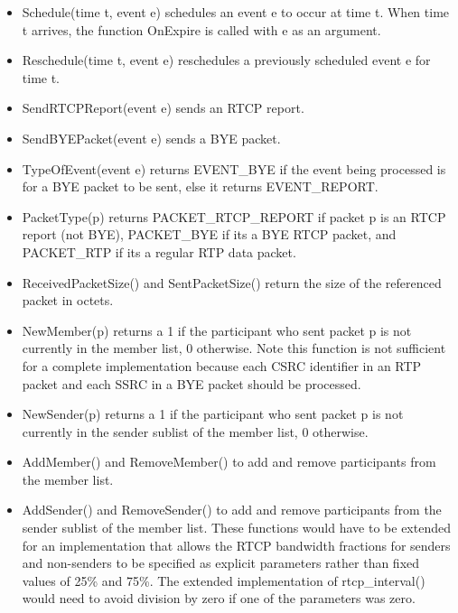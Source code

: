\documentclass{article}
\begin{document}
\begin{itemize}
\item Schedule(time t, event e) schedules an event e to occur at time t. When time t arrives, the function OnExpire is called with e as an argument.
\item Reschedule(time t, event e) reschedules a previously scheduled event e for time t.
\item SendRTCPReport(event e) sends an RTCP report.
\item SendBYEPacket(event e) sends a BYE packet.
\item TypeOfEvent(event e) returns EVENT\_BYE if the event being processed is for a BYE packet to be sent, else it returns EVENT\_REPORT.
\item PacketType(p) returns PACKET\_RTCP\_REPORT if packet p is an RTCP report (not BYE), PACKET\_BYE if its a BYE RTCP packet, and PACKET\_RTP if its a regular RTP data packet.
\item ReceivedPacketSize() and SentPacketSize() return the size of the referenced packet in octets.
\item NewMember(p) returns a 1 if the participant who sent packet p is not currently in the member list, 0 otherwise.  Note this function is not sufficient for a complete implementation because each CSRC identifier in an RTP packet and each SSRC in a BYE packet should be processed.
\item NewSender(p) returns a 1 if the participant who sent packet p is not currently in the sender sublist of the member list, 0 otherwise.
\item AddMember() and RemoveMember() to add and remove participants from the member list.
\item AddSender() and RemoveSender() to add and remove participants from the sender sublist of the member list.
These functions would have to be extended for an implementation that allows the RTCP bandwidth fractions for senders and non-senders to be specified as explicit parameters rather than fixed values of 25\% and 75\%.  The extended implementation of rtcp\_interval() would need to avoid division by zero if one of the parameters was zero.


\end{itemize}
\end{document}
